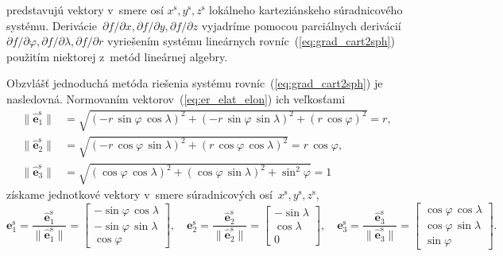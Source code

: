 \documentclass[a4paper, 12pt]{book}
\let\vec\mathbf
\begin{document}
%
predstavujú vektory v~smere osí $x^{\mathrm{s}}, y^{\mathrm{s}}, 
z^{\mathrm{s}}$ lokálneho karteziánskeho súradnicového systému.  
Derivácie~$\partial f \slash \partial x, \partial f \slash \partial y, \partial 
f \slash \partial z$ vyjadríme pomocou parciálnych derivácií $\partial f \slash 
\partial \varphi, \partial f \slash \partial \lambda, \partial f \slash 
\partial r$ vyriešením systému lineárnych rovníc~(\ref{eq:grad_cart2sph}) 
použitím niektorej z~metód lineárnej algebry.

Obzvlášť jednoduchá metóda riešenia systému rovníc~(\ref{eq:grad_cart2sph}) je 
nasledovná.  Normovaním vektorov~(\ref{eq:er_elat_elon}) ich veľkosťami
%
\begin{equation}
\begin{aligned}
\| \hat{\vec e}_1^\mathrm{s} \| &= \sqrt{(-r \, \sin\varphi \, \cos\lambda)^2 
+ (-r \, \sin\varphi \, \sin\lambda)^2 + (r \, \cos\varphi)^2} = r{,}\\
%
\| \hat{\vec e}_2^\mathrm{s} \| &= \sqrt{(-r \, \cos\varphi \, \sin\lambda)^2 
+ (r \, \cos\varphi \, \cos\lambda)^2} = r \, \cos\varphi{,}\\
%
\| \hat{\vec e}_3^\mathrm{s} \| &= \sqrt{(\cos\varphi \, \cos\lambda)^2 
+ (\cos\varphi \, \sin\lambda)^2 + \sin^2\varphi} = 1
%
\end{aligned}
\end{equation}
%
získame jednotkové vektory v~smere súradnicových osí~$x^\mathrm{s}, 
y^\mathrm{s}, z^\mathrm{s}$,
%
\begin{equation}
\label{eq:er_elat_elon_unit}
%
\vec e^\mathrm{s}_1 = \frac{\hat{\vec e}_1^\mathrm{s}}{\| \hat{\vec 
e}_1^\mathrm{s} \|} = 
%
\begin{bmatrix}
-\sin\varphi \, \cos\lambda\\
-\sin\varphi \, \sin\lambda\\
\cos\varphi
\end{bmatrix}
%
{,}\quad
%
\vec e^\mathrm{s}_2 = \frac{\hat{\vec e}_2^\mathrm{s}}{\| \hat{\vec 
e}_2^\mathrm{s} \|} = 
%
\begin{bmatrix}
-\sin\lambda\\
\cos\lambda\\
0
\end{bmatrix}
%
{,}\quad
%
\vec e^\mathrm{s}_3 = \frac{\hat{\vec e}_3^\mathrm{s}}{\| \hat{\vec 
e}_3^\mathrm{s} \|} = 
%
\begin{bmatrix}
\cos\varphi \, \cos\lambda\\
\cos\varphi \, \sin\lambda\\
\sin\varphi
\end{bmatrix}
%
{.}
%
\end{equation}
\end{document}
